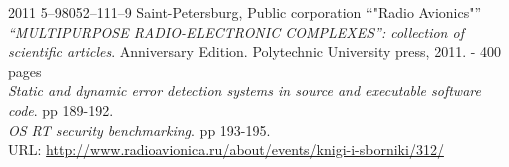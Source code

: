 

\begin{entrylist}
    \entry
    {2011}
    {5–98052–111–9}
    {Saint-Petersburg, Public corporation \enquote{"Radio Avionics"}}
    {\textit{\enquote{MULTIPURPOSE RADIO-ELECTRONIC COMPLEXES}: collection of scientific articles}. Anniversary Edition. Polytechnic University press, 2011. - 400 pages \\
    \textit{Static and dynamic error detection systems in source and executable software code}. pp 189-192. \\
    \textit{OS RT security benchmarking}. pp 193-195.\\
    URL: \url{http://www.radioavionica.ru/about/events/knigi-i-sborniki/312/}
    }
\end{entrylist}
